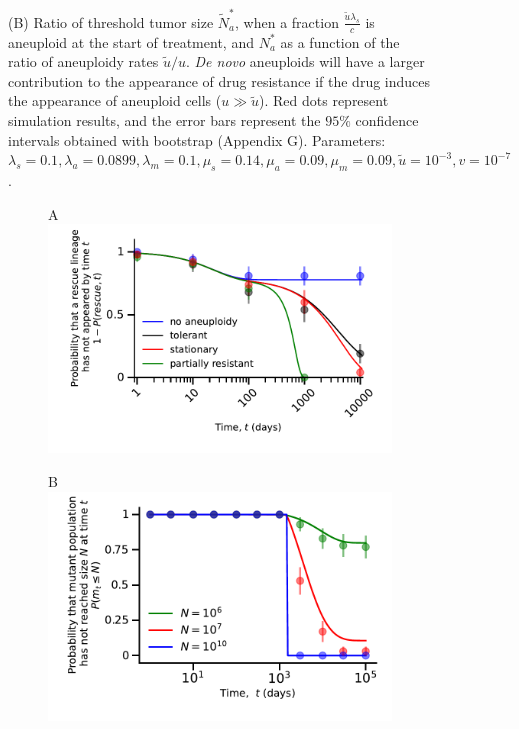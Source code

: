 \documentclass[12pt]{extarticle}
\begin{document}
\begin{figure}
{(B) Ratio of threshold tumor size $\tilde{N}_a^*$, when a fraction $\frac{\tilde{u}\lambda_s}{c}$ is aneuploid at the start of treatment, and $N_a^*$ as a function of the ratio of aneuploidy rates $\tilde{u}/u$. \textit{De novo} aneuploids will have a larger contribution to the appearance of drug resistance if the drug induces the appearance of aneuploid cells ($u \gg \tilde u$). Red dots represent simulation results, and the error bars represent the $95\%$ confidence intervals obtained with bootstrap (Appendix G). Parameters: $\lambda_s=0.1,\lambda_a=0.0899,\lambda_m=0.1,\mu_s=0.14,\mu_a=0.09,\mu_m=0.09,\tilde{u}=10^{-3}, v=10^{-7}$.
}
\label{rescue_denovo}
\end{figure}


\begin{figure}
\vspace*{1\baselineskip}
\begin{subfigure}{0.5\textwidth}
A\\
\includegraphics[width=1\textwidth]{Figures/ReboundProbability.pdf}
\end{subfigure}
\begin{subfigure}{0.5\textwidth}
B\\
\includegraphics[width=1\textwidth]{Figures/ProliferationTimeCDFN.pdf}

\end{subfigure}
\end{figure}
\end{document}
